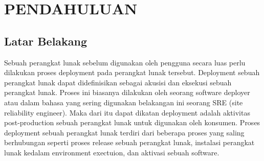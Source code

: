 \chapter{PENDAHULUAN}

\vspace{4.5pt}
\setlength{\parskip}{0.5em}

\section{Latar Belakang} \label{sec:latar_belakang}
Sebuah perangkat lunak sebelum digunakan oleh pengguna secara luas perlu dilakukan proses deployment
pada perangkat lunak tersebut. Deployment sebuah perangkat lunak dapat didefinisikan sebagai akusisi
dan eksekusi sebuah perangkat lunak. Proses ini biasanya dilakukan oleh seorang software deployer atau dalam bahasa yang sering
digunakan belakangan ini seorang SRE (site reliability engineer)\cite{Lyu2007}.
Maka dari itu dapat dikatan deployment adalah aktivitas post-production sebuah perangkat lunak untuk digunakan oleh konsumen.
Proses deployment sebuah perangkat lunak terdiri dari beberapa proses yang saling berhubungan seperti proses release sebuah perangkat lunak,
instalasi perangkat lunak kedalam environment exectuion, dan aktivasi sebuah software\cite{Carzaniga1998}.

